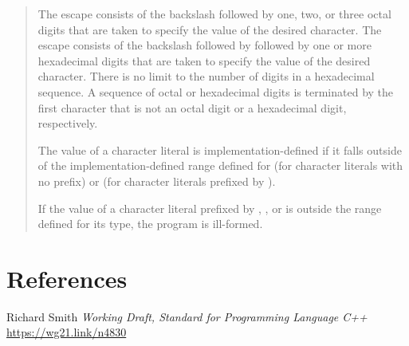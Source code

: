 \documentclass{wg21}
\begin{document}
\begin{quote}
The escape
 consists of the backslash followed by one,
two, or three octal digits that are taken to specify the value of the
desired character. The escape
consists of the backslash followed by  followed by one or more
hexadecimal digits that are taken to specify the value of the desired
character. There is no limit to the number of digits in a hexadecimal
sequence. A sequence of octal or hexadecimal digits is terminated by the
first character that is not an octal digit or a hexadecimal digit,
respectively.

\begin{removedblock}
The value of a character literal is implementation-defined if it falls outside
of the implementation-defined
range defined for  (for character literals with no prefix) or
 (for character literals prefixed by ).

\begin{note}
	If the value of a character literal prefixed by
	, , or 
	is outside the range defined for its type, 
	the program is ill-formed.
\end{note}
\end{removedblock}



\end{quote}


\section{References}
\renewcommand{\section}[2]{}%
\begin{thebibliography}{9}

\end{thebibliography}

Richard Smith
\emph{Working Draft, Standard for Programming Language C++}\newline
\url{https://wg21.link/n4830}
\end{document}

